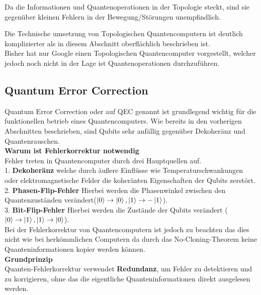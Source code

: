 Da die Informationen und Quantenoperationen in der Topologie steckt, sind sie gegenüber kleinen Fehlern in der Bewegung/Störungen unempfindlich.\\

\begin{tcolorbox}[title=Kommentar,
    title filled=false,
    colback=cyan!5!white,
    colframe=cyan!75!black]
    Die Technische umsetzung von Topologischen Quantencomputern ist deutlich komplizierter als in diesem Abschnitt oberflächlich beschrieben ist.\\
    Bisher hat nur Google einen Topologischen Quantencomputer vorgestellt, welcher jedoch noch nicht in der Lage ist Quantenoperationen durchzuführen.
\end{tcolorbox}

\subsection{Quantum Error Correction}
\label{sub:quantum_error_correction}
Quantum Error Correction oder auf QEC genannt ist grundlegend wichtig für die funktionellen betrieb eines Quantencomputers. Wie bereits in den vorherigen Abschnitten beschrieben,
sind Qubits sehr anfällig gegenüber Dekoheränz und Quantenrauschen.\\

\textbf{Warum ist Fehlerkorrektur notwendig}\\
Fehler treten in Quantencomputer durch drei Hauptquellen auf.\\
1. \textbf{Dekoheränz} welche durch äußere Einflüsse wie Temperaturschwankungen oder elektromagnetische Felder die koheränten Eigenschaften der Qubits zerstört.\\
2. \textbf{Phasen-Flip-Fehler} Hierbei werden die Phasenwinkel zwischen den Quantenzuständen verändert($\ket{0}\rightarrow\ket{0},\ket{1}\rightarrow-\ket{1}$).\\ 
3. \textbf{Bit-Flip-Fehler} Hierbei werden die Zustände der Qubits verändert ($\ket{0}\rightarrow\ket{1},\ket{1}\rightarrow\ket{0}$).\\

Bei der Fehlerkorrektur von Quantencomputern ist jedoch zu beachten das dies nicht wie bei herkömmlichen Computern da durch das No-Cloning-Theorem keine Quanteninformationen kopier werden können.\\

\textbf{Grundprinzip}\\
Quanten-Fehlerkorrektur verwendet \textbf{Redundanz}, um Fehler zu detektieren und zu korrigieren, ohne das die eigentliche Quanteninformationen direkt ausgelesen werden.\\

